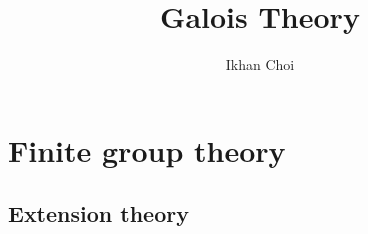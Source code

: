 \documentclass{../note}
\begin{document}
\title{Galois Theory}
\author{Ikhan Choi}
\maketitle
\tableofcontents





\part{Finite group theory}
\iffalse
presentation
	quotient of a free group
	homomorphism 잡기
		free group을 정의역으로 먼저 잡고 well-defined 보여서 quotient로 내리기
	element들을 두 제너레이터로 표현하기
isomorphism 보이기
	isomorphism theorem
	order argument
subgroup criterion: 항등원, 역원, 닫힘 순으로 증명
centralizer, center, normalizer
	각 그룹의 계산 -> 기본적으로 노가다, 마지막에 라그랑지 확인
	센트럴라이저의 대칭성
	N(H)/C(H) 정리, G/Z(G)=Inn(G)
stabilizer


----------
#
아벨군: 순환군, n-abelian 등 여러 조건, 기본정리
대칭군: 생성원, 트랜지티브, 교대군과 부호
콕세터: 이면군, 프레젠테이션
선형군: 

#
액션, 실로우: existence, congruence condition
부분군격자: 1. 특정위수 부분군의 존재성, 2. 각 부분군의 컨쥬게이트 개수
	노멀라이저의 크기를 잰다는 것 = 실로우군의 conjugate 개수 세는 것
	- 카운팅: 너무 많은 conjugate 배제하는 법
	- 인덱스: 푸앵카레 정리, least prime ind
	- 노말라이즈되는 부분군 잡아 노말라이저 띄우기
	케이스 나누기에 매우 좋은 조건을 제공
		노말 실로우 -> 바로 반직접곱
http://oeis.org/wiki/Number_of_groups_of_order_n

#
군 확장
컴포지션 시리즈의 이해
반직접: / 계산->아벨군의 자기동형군
중심적: 군코호몰로지 / 계산->보편계수정리

#
단순군: 단순군 아니기 테크닉, 단순군 보이기 테크닉, 교대군과 리타입 선형군

#
p군: 비자명센터, 개수 겁나많음
닐포턴트: 피팅, 프라티니
솔버블?
센트럴 시리즈?


\fi


\chapter{Extension theory}
\end{document}
